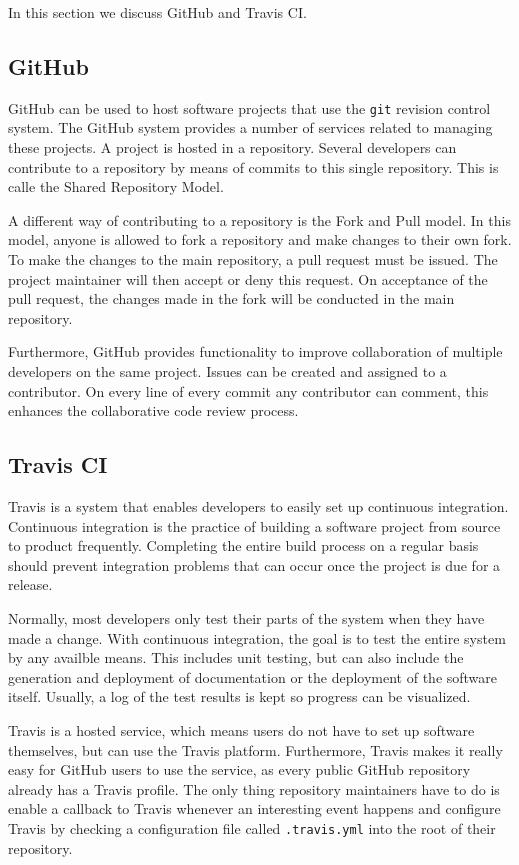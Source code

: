 In this section we discuss GitHub and Travis CI.

\subsection{GitHub}
GitHub can be used to host software projects that use the \texttt{git} revision control system. 
The GitHub system provides a number of services related to managing these projects. 
A project is hosted in a repository. 
Several developers can contribute to a repository by means of commits to this single repository.
This is calle the Shared Repository Model.
 
A different way of contributing to a repository is the Fork and Pull model.
In this model, anyone is allowed to fork a repository and make changes to their own fork.
To make the changes to the main repository, a pull request must be issued.
The project maintainer will then accept or deny this request.
On acceptance of the pull request, the changes made in the fork will be conducted in the main repository.

Furthermore, GitHub provides functionality to improve collaboration of multiple developers on the same project.
Issues can be created and assigned to a contributor. 
On every line of every commit any contributor can comment, this enhances the collaborative code review process.

\subsection{Travis CI}
Travis is a system that enables developers to easily set up continuous integration.
Continuous integration is the practice of building a software project from source to product frequently.
Completing the entire build process on a regular basis should prevent integration problems that can occur once the project is due for a release.

Normally, most developers only test their parts of the system when they have made a change.
With continuous integration, the goal is to test the entire system by any availble means.
This includes unit testing, but can also include the generation and deployment of documentation or the deployment of the software itself.
Usually, a log of the test results is kept so progress can be visualized.

Travis is a hosted service, which means users do not have to set up software themselves, but can use the Travis platform.
Furthermore, Travis makes it really easy for GitHub users to use the service, as every public GitHub repository already has a Travis profile.
The only thing repository maintainers have to do is enable a callback to Travis whenever an interesting event happens and configure Travis by checking a configuration file called \texttt{.travis.yml} into the root of their repository.

